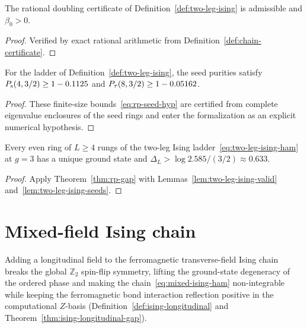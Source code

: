 \begin{lemma}
  \label{lem:two-leg-ising-valid}
  \leanok
  The rational doubling certificate of Definition~\ref{def:two-leg-ising} is admissible and
  \(\beta_0 > 0\).
\end{lemma}
\begin{proof}
  \leanok
  Verified by exact rational arithmetic from Definition~\ref{def:chain-certificate}.
\end{proof}

\begin{lemma}
  \label{lem:two-leg-ising-seeds}
  \leanok
  For the ladder of Definition~\ref{def:two-leg-ising}, the seed purities satisfy
  \(P_{\mathrm{s}}(4, 3/2) \ge 1 - 0.1125\) and \(P_{\tau}(8, 3/2) \ge 1 - 0.05162\).
\end{lemma}
\begin{proof}
  These finite-size bounds~\eqref{eq:rp-seed-hyp} are certified from complete eigenvalue enclosures
  of the seed rings and enter the formalization as an explicit numerical hypothesis.
\end{proof}

\begin{theorem}
  \label{thm:two-leg-ising-gap}
  \leanok
  Every even ring of \(L \ge 4\) rungs of the two-leg Ising ladder~\eqref{eq:two-leg-ising-ham} at
  \(g = 3\) has a unique ground state and \(\Delta_L > \log 2.585 / (3/2) \approx 0.633\).
\end{theorem}
\begin{proof}
  \leanok
  Apply Theorem~\ref{thm:rp-gap} with Lemmas~\ref{lem:two-leg-ising-valid}
  and~\ref{lem:two-leg-ising-seeds}.
\end{proof}

\section{Mixed-field Ising chain}

Adding a longitudinal field to the ferromagnetic transverse-field Ising chain~\cite{Pfeuty1970One}
breaks the global \(\mathbb{Z}_2\) spin-flip symmetry, lifting the ground-state degeneracy of the
ordered phase and making the chain~\eqref{eq:mixed-ising-ham} non-integrable while keeping the
ferromagnetic bond interaction reflection positive in the computational \(Z\)-basis
(Definition~\ref{def:ising-longitudinal} and Theorem~\ref{thm:ising-longitudinal-gap}).

